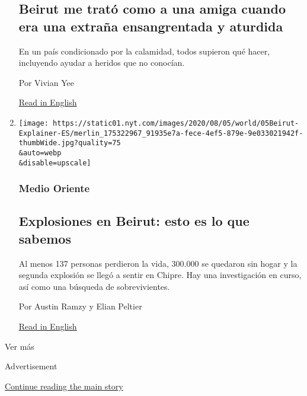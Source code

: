 \begin{enumerate}
  \hypertarget{beirut-me-tratuxf3-como-a-una-amiga-cuando-era-una-extrauxf1a-ensangrentada-y-aturdida}{%
  \subsection{Beirut me trató como a una amiga cuando era una extraña
  ensangrentada y
  aturdida}\label{beirut-me-tratuxf3-como-a-una-amiga-cuando-era-una-extrauxf1a-ensangrentada-y-aturdida}}

  En un país condicionado por la calamidad, todos supieron qué hacer,
  incluyendo ayudar a heridos que no conocían.

  Por Vivian Yee

  \href{https://www.nytimes.com/2020/08/04/world/middleeast/lebanon-explosion-beirut.html}{Read
  in English}
\item
  \href{/es/2020/08/05/espanol/mundo/explosion-beirut-que-paso.html}{}

  \texttt{[image: https://static01.nyt.com/images/2020/08/05/world/05Beirut-Explainer-ES/merlin\_175322967\_91935e7a-fece-4ef5-879e-9e033021942f-thumbWide.jpg?quality=75\\\&auto=webp\\\&disable=upscale]}

  \hypertarget{medio-oriente-2}{%
  \subsubsection{Medio Oriente}\label{medio-oriente-2}}

  \hypertarget{explosiones-en-beirut-esto-es-lo-que-sabemos}{%
  \subsection{Explosiones en Beirut: esto es lo que
  sabemos}\label{explosiones-en-beirut-esto-es-lo-que-sabemos}}

  Al menos 137 personas perdieron la vida, 300.000 se quedaron sin hogar
  y la segunda explosión se llegó a sentir en Chipre. Hay una
  investigación en curso, así como una búsqueda de sobrevivientes.

  Por Austin Ramzy y Elian Peltier

  \href{https://www.nytimes.com/2020/08/05/world/middleeast/beirut-explosion-what-happened.html}{Read
  in English}
\end{enumerate}

Ver más

Advertisement

\protect\hyperlink{after-mid3}{Continue reading the main story}

